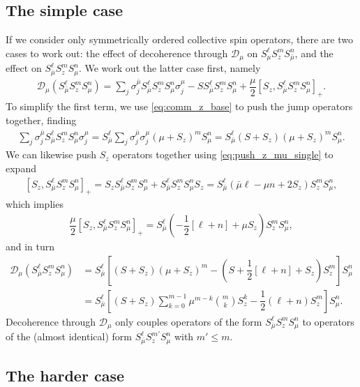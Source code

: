\documentclass[aps,notitlepage,nofootinbib,11pt]{revtex4-1}
\newcommand{\f}[2]{\dfrac{#1}{#2}} %
\newcommand{\p}[1]{\left(#1\right)} %
\renewcommand{\sp}[1]{\left[#1\right]} %
\newcommand{\D}{\mathcal{D}}
\newcommand{\bmu}{{\bar\mu}}
\newcommand{\1}{\mathds{1}}
\begin{document}
\subsection{The simple case}

If we consider only symmetrically ordered collective spin operators,
there are two cases to work out: the effect of decoherence through
$\D_\mu$ on $S_\mu^\ell S_z^m S_\bmu^n$, and the effect on
$S_\bmu^\ell S_z^m S_\mu^n$.  We work out the latter case first,
namely
\begin{align}
  \D_\mu\p{S_\bmu^\ell S_z^m S_\mu^n}
  = \sum_j\sigma_j^\bmu S_\bmu^\ell S_z^m S_\mu^n \sigma_j^\mu
  - S S_\bmu^\ell S_z^m S_\mu^n
  + \f{\mu}{2} \sp{S_z, S_\bmu^\ell S_z^m S_\mu^n}_+.
\end{align}
To simplify the first term, we use \eqref{eq:comm_z_base} to push the
jump operators together, finding
\begin{align}
  \sum_j \sigma_j^\bmu S_\bmu^\ell S_z^m S_\mu^n \sigma_j^\mu
  = S_\bmu^\ell \sum_j \sigma_j^\bmu \sigma_j^\mu \p{\mu+S_z}^m S_\mu^n
  = S_\bmu^\ell \p{S+S_z} \p{\mu+S_z}^m S_\mu^n.
\end{align}
We can likewise push $S_z$ operators together using
\eqref{eq:push_z_mu_single} to expand
\begin{align}
  \sp{S_z, S_\bmu^\ell S_z^m S_\mu^n}_+
  = S_z S_\bmu^\ell S_z^m S_\mu^n + S_\bmu^\ell S_z^m S_\mu^n S_z
  = S_\bmu^\ell\p{\bmu\ell - \mu n + 2 S_z} S_z^m S_\mu^n,
\end{align}
which implies
\begin{align}
  \f{\mu}{2} \sp{S_z, S_\bmu^\ell S_z^m S_\mu^n}_+
  = S_\bmu^\ell\p{-\f12\sp{\ell+n} + \mu S_z} S_z^m S_\mu^n,
\end{align}
and in turn
\begin{align}
  \D_\mu\p{S_\bmu^\ell S_z^m S_\mu^n}
  &= S_\bmu^\ell \sp{\p{S+S_z} \p{\mu+S_z}^m
    - \p{S + \f12\sp{\ell+n} + S_z} S_z^m} S_\mu^n \\
  &= S_\bmu^\ell
  \sp{\p{S+S_z} \sum_{k=0}^{m-1} \mu^{m-k} { m \choose k} S_z^k
  - \f12\p{\ell+n} S_z^m} S_\mu^n.
\end{align}
Decoherence through $\D_\mu$ only couples operators of the form
$S_\bmu^\ell S_z^m S_\mu^n$ to operators of the (almost identical)
form $S_\bmu^\ell S_z^{m'} S_\mu^n$ with $m'\le m$.


\subsection{The harder case}
\end{document}
